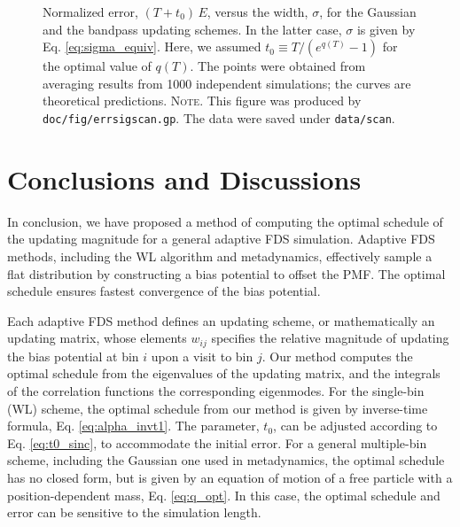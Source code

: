 \documentclass[reprint, floatfix]{revtex4-1}
\newcommand{\note}[1]{{\color{DarkGreen}\footnotesize \textsc{Note.} #1}}
\begin{document}
\begin{figure}[h]
\begin{center}
  \caption{
    \label{fig:errsigscan}
    Normalized error, $(T + t_0) \, E$,
    versus the width, $\sigma$,
    for the Gaussian
    and the bandpass updating schemes.
    In the latter case,
    $\sigma$ is given by Eq. \eqref{eq:sigma_equiv}.
    Here, we assumed $t_0 \equiv T/(e^{q(T)} - 1)$
    for the optimal value of $q(T)$.
    The points were obtained from averaging results
    from 1000 independent simulations;
    the curves are theoretical predictions.
    \note{This figure was produced by
      \texttt{doc/fig/errsigscan.gp}.
      The data were saved under
      \texttt{data/scan}.
    }%
  }
\end{center}
\end{figure}





\section{\label{sec:conclusion}
Conclusions and Discussions}



In conclusion,
we have proposed a method of computing
the optimal schedule of the updating magnitude
for a general adaptive FDS simulation.
%
Adaptive FDS methods,
including the WL algorithm and metadynamics,
effectively sample a flat distribution
by constructing a bias potential
to offset the PMF.
%
The optimal schedule ensures fastest convergence
of the bias potential.



Each adaptive FDS method defines an updating scheme,
or mathematically an updating matrix,
whose elements $w_{ij}$ specifies the
relative magnitude of updating the bias potential
at bin $i$ upon a visit to bin $j$.
%
Our method computes the optimal schedule from
the eigenvalues of the updating matrix,
and the integrals of the correlation functions
the corresponding eigenmodes.
%
For the single-bin (WL) scheme,
the optimal schedule from our method
is given by inverse-time formula,
Eq. \eqref{eq:alpha_invt1}.
%
The parameter, $t_0$, can be adjusted
according to Eq. \eqref{eq:t0_sinc},
to accommodate the initial error.
%
For a general multiple-bin scheme,
including the Gaussian one used in metadynamics,
the optimal schedule has no closed form,
but is given by an equation of motion
of a free particle with a position-dependent mass, Eq. \eqref{eq:q_opt}.
%
In this case,
the optimal schedule and error
can be sensitive to the simulation length.
\end{document}
